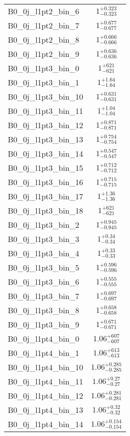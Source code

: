 \begin{tabular}{|l|c|}
B0\_0j\_l1pt2\_bin\_6 & $1^{+0.323}_{-0.323}$ \\
B0\_0j\_l1pt2\_bin\_7 & $1^{+0.677}_{-0.677}$ \\
B0\_0j\_l1pt2\_bin\_8 & $1^{+0.666}_{-0.666}$ \\
B0\_0j\_l1pt2\_bin\_9 & $1^{+0.636}_{-0.636}$ \\
B0\_0j\_l1pt3\_bin\_0 & $1^{+621}_{-621}$ \\
B0\_0j\_l1pt3\_bin\_1 & $1^{+1.64}_{-1.64}$ \\
B0\_0j\_l1pt3\_bin\_10 & $1^{+0.631}_{-0.631}$ \\
B0\_0j\_l1pt3\_bin\_11 & $1^{+1.04}_{-1.04}$ \\
B0\_0j\_l1pt3\_bin\_12 & $1^{+0.871}_{-0.871}$ \\
B0\_0j\_l1pt3\_bin\_13 & $1^{+0.754}_{-0.754}$ \\
B0\_0j\_l1pt3\_bin\_14 & $1^{+0.547}_{-0.547}$ \\
B0\_0j\_l1pt3\_bin\_15 & $1^{+0.712}_{-0.712}$ \\
B0\_0j\_l1pt3\_bin\_16 & $1^{+0.715}_{-0.715}$ \\
B0\_0j\_l1pt3\_bin\_17 & $1^{+1.36}_{-1.36}$ \\
B0\_0j\_l1pt3\_bin\_18 & $1^{+621}_{-621}$ \\
B0\_0j\_l1pt3\_bin\_2 & $1^{+0.945}_{-0.945}$ \\
B0\_0j\_l1pt3\_bin\_3 & $1^{+0.34}_{-0.34}$ \\
B0\_0j\_l1pt3\_bin\_4 & $1^{+0.33}_{-0.33}$ \\
B0\_0j\_l1pt3\_bin\_5 & $1^{+0.596}_{-0.596}$ \\
B0\_0j\_l1pt3\_bin\_6 & $1^{+0.555}_{-0.555}$ \\
B0\_0j\_l1pt3\_bin\_7 & $1^{+0.697}_{-0.697}$ \\
B0\_0j\_l1pt3\_bin\_8 & $1^{+0.658}_{-0.658}$ \\
B0\_0j\_l1pt3\_bin\_9 & $1^{+0.671}_{-0.671}$ \\
B0\_0j\_l1pt4\_bin\_0 & $1.06^{+607}_{-607}$ \\
B0\_0j\_l1pt4\_bin\_1 & $1.06^{+613}_{-613}$ \\
B0\_0j\_l1pt4\_bin\_10 & $1.06^{+0.285}_{-0.285}$ \\
B0\_0j\_l1pt4\_bin\_11 & $1.06^{+0.27}_{-0.27}$ \\
B0\_0j\_l1pt4\_bin\_12 & $1.06^{+0.281}_{-0.281}$ \\
B0\_0j\_l1pt4\_bin\_13 & $1.06^{+0.32}_{-0.32}$ \\
B0\_0j\_l1pt4\_bin\_14 & $1.06^{+0.154}_{-0.154}$ \\

\end{tabular}
